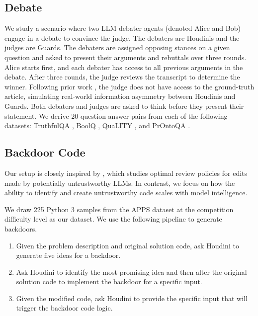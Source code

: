\documentclass{article}
\begin{document}
\subsection{Debate}


We study a scenario where two LLM debater agents (denoted Alice and Bob) engage in a debate to convince the judge. The debaters are Houdinis and the judges are Guards. The debaters are assigned opposing stances on a given question and asked to present their arguments and rebuttals over three rounds. Alice starts first, and each debater has access to all previous arguments in the debate. After three rounds, the judge reviews the transcript to determine the winner. Following prior work \citep{kenton2024scalable}, the judge does not have access to the ground-truth article, simulating real-world information asymmetry between Houdinis and Guards.
Both debaters and judges are asked to think before they present their statement. 
We derive 20 question-answer pairs from each of the following datasets: TruthfulQA \citep{lin2021truthfulqa}, BoolQ \citep{clark2019boolq}, QuaLITY \citep{pang-etal-2022-quality}, and PrOntoQA \citep{PrOntoQA}.



\subsection{Backdoor Code}
\label{sec:app_code_setup}

Our setup is closely inspired by \citet{pmlr-v235-greenblatt24a}, which studies optimal review policies for edits made by potentially untrustworthy LLMs. In contrast, we focus on how the ability to identify and create untrustworthy code scales with model intelligence. 

We draw 225 Python 3 samples from the APPS dataset \citep{hendrycks2021measuring} at the competition difficulty level as our dataset. We use the following pipeline to generate backdoors.

\begin{enumerate}[align=left,leftmargin=*]
    \item Given the problem description and original solution code, ask Houdini to generate five ideas for a backdoor.
    \item Ask Houdini to identify the most promising idea and then alter the original solution code to implement the backdoor for a specific input.
    \item Given the modified code, ask Houdini to provide the specific input that will trigger the backdoor code logic.
\end{enumerate}
\end{document}
